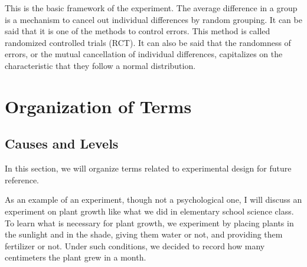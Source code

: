 \documentclass{ltjbook}
\begin{document}


This is the basic framework of the experiment. The average difference in a group is a mechanism to cancel out individual differences by random grouping. It can be said that it is one of the methods to control errors. This method is called randomized controlled trials (RCT). It can also be said that the randomness of errors, or the mutual cancellation of individual differences, capitalizes on the characteristic that they follow a normal distribution.


\section{Organization of Terms}
\subsection{Causes and Levels}

In this section, we will organize terms related to experimental design for future reference.

As an example of an experiment, though not a psychological one, I will discuss an experiment on plant growth like what we did in elementary school science class. To learn what is necessary for plant growth, we experiment by placing plants in the sunlight and in the shade, giving them water or not, and providing them fertilizer or not. Under such conditions, we decided to record how many centimeters the plant grew in a month.
\end{document}
